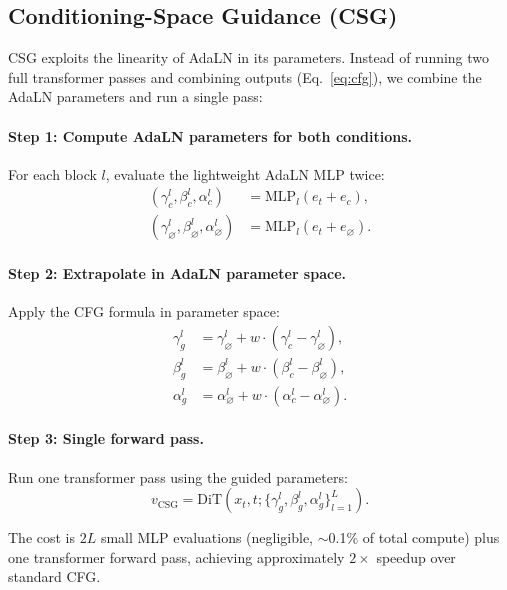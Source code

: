 \documentclass{article}
\newcommand{\adaln}{AdaLN}
\begin{document}
\subsection{Conditioning-Space Guidance (CSG)}

CSG exploits the linearity of \adaln{} in its parameters. Instead of running two full transformer passes and combining outputs (Eq.~\ref{eq:cfg}), we combine the \adaln{} parameters and run a single pass:

\paragraph{Step 1: Compute \adaln{} parameters for both conditions.} For each block $l$, evaluate the lightweight \adaln{} MLP twice:
\begin{align}
    (\gamma_c^l, \beta_c^l, \alpha_c^l) &= \text{MLP}_l(e_t + e_c), \\
    (\gamma_\varnothing^l, \beta_\varnothing^l, \alpha_\varnothing^l) &= \text{MLP}_l(e_t + e_\varnothing).
\end{align}

\paragraph{Step 2: Extrapolate in \adaln{} parameter space.} Apply the CFG formula in parameter space:
\begin{align}
    \gamma_g^l &= \gamma_\varnothing^l + w \cdot (\gamma_c^l - \gamma_\varnothing^l), \label{eq:csg_gamma} \\
    \beta_g^l &= \beta_\varnothing^l + w \cdot (\beta_c^l - \beta_\varnothing^l), \label{eq:csg_beta} \\
    \alpha_g^l &= \alpha_\varnothing^l + w \cdot (\alpha_c^l - \alpha_\varnothing^l). \label{eq:csg_alpha}
\end{align}

\paragraph{Step 3: Single forward pass.} Run one transformer pass using the guided parameters:
\begin{equation}
    v_{\text{CSG}} = \text{DiT}(x_t, t; \{\gamma_g^l, \beta_g^l, \alpha_g^l\}_{l=1}^L).
\end{equation}

The cost is $2L$ small MLP evaluations (negligible, $\sim$0.1\% of total compute) plus one transformer forward pass, achieving approximately $2\times$ speedup over standard CFG.
\end{document}
